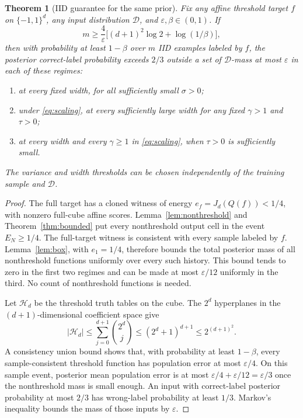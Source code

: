 \documentclass[11pt]{article}
\newtheorem{theorem}{Theorem}
\begin{document}
\begin{theorem}[IID guarantee for the same prior]\label{thm:iid}
Fix any affine threshold target $f$ on $\{-1,1\}^d$, any input
distribution $\mathcal D$, and $\varepsilon,\beta\in(0,1)$. If
\[
 m\ge\frac4\varepsilon
       \bigl[(d+1)^2\log2+\log(1/\beta)\bigr],
\]
then with probability at least $1-\beta$ over $m$ IID examples labeled
by $f$, the posterior correct-label probability exceeds $2/3$ outside a
set of $\mathcal D$-mass at most $\varepsilon$ in each of these regimes:
\begin{enumerate}
\item at every fixed width, for all sufficiently small $\sigma>0$;
\item under \eqref{eq:scaling}, at every sufficiently large width for
any fixed $\gamma>1$ and $\tau>0$;
\item at every width and every $\gamma\ge1$ in \eqref{eq:scaling},
when $\tau>0$ is sufficiently small.
\end{enumerate}
The variance and width thresholds can be chosen independently of the
training sample and $\mathcal D$.
\end{theorem}
\begin{proof}
The full target has a cloned witness of energy
$e_f=J_d(Q(f))<1/4$, with nonzero full-cube affine scores.
Lemma~\ref{lem:nonthreshold} and Theorem~\ref{thm:bounded} put every
nonthreshold output cell in the
event $E_N\ge1/4$. The full-target witness is consistent with every
sample labeled by $f$. Lemma~\ref{lem:box}, with $e_1=1/4$, therefore
bounds the total posterior mass of all nonthreshold functions uniformly
over every such history. This bound tends to zero in the first two
regimes and can be made at most $\varepsilon/12$ uniformly in the third.
No count of nonthreshold functions is needed.

Let $\mathcal H_d$ be the threshold truth tables on the cube. The
$2^d$ hyperplanes in the $(d+1)$-dimensional coefficient space give
\[
 |\mathcal H_d|\le\sum_{j=0}^{d+1}\binom{2^d}{j}
 \le(2^d+1)^{d+1}\le2^{(d+1)^2}.
\]
A consistency union bound shows that, with probability at least $1-\beta$,
every sample-consistent threshold function has population error at most
$\varepsilon/4$. On this sample event, posterior mean population error
is at most $\varepsilon/4+\varepsilon/12=\varepsilon/3$ once the
nonthreshold mass is small enough. An input with correct-label posterior
probability at most $2/3$ has wrong-label probability at least $1/3$.
Markov's inequality bounds the mass of those inputs by $\varepsilon$.
\end{proof}
\end{document}
